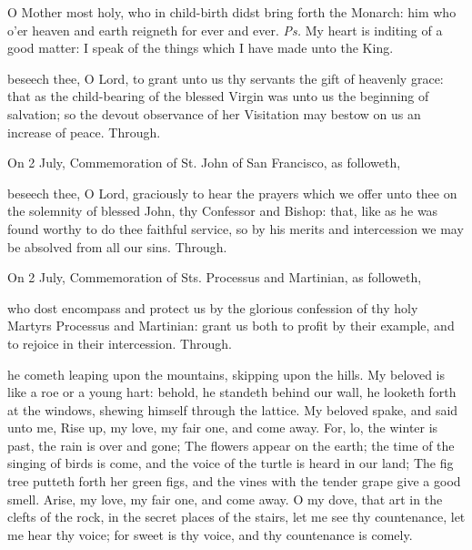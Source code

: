 \vspace{-0.2\baselineskip}

\introit
{} O Mother most holy, who in child-birth didst bring forth the Monarch: him who o'er heaven and earth reigneth for ever and ever. \textit{Ps.} My heart is inditing of a good matter: I speak of the things which I have made unto the King.

\vspace{-0.2\baselineskip}

\collect
{} beseech thee, O Lord, to grant unto us thy servants the gift of heavenly grace: that as the child-bearing of the blessed Virgin was unto us the beginning of salvation; so the devout observance of her Visitation may bestow on us an increase of peace. Through.

\begin{rubric}
	 On 2 July, Commemoration of St. John of San Francisco, as followeth,
\end{rubric}
 beseech thee, O Lord, graciously to hear the prayers which we offer unto thee on the solemnity of blessed John, thy Confessor and Bishop: that, like as he was found worthy to do thee faithful service, so by his merits and intercession we may be absolved from all our sins. Through.

\begin{rubric}
	 On 2 July, Commemoration of Sts. Processus and Martinian, as followeth,
\end{rubric}
 who dost encompass and protect us by the glorious confession of thy holy Martyrs Processus and Martinian: grant us both to profit by their example, and to rejoice in their intercession. Through.

 he cometh leaping upon the mountains, skipping upon the hills. My beloved is like a roe or a young hart: behold, he standeth behind our wall, he looketh forth at the windows, shewing himself through the lattice. My beloved spake, and said unto me, Rise up, my love, my fair one, and come away. For, lo, the winter is past, the rain is over and gone; The flowers appear on the earth; the time of the singing of birds is come, and the voice of the turtle is heard in our land; The fig tree putteth forth her green figs, and the vines with the tender grape give a good smell. Arise, my love, my fair one, and come away. O my dove, that art in the clefts of the rock, in the secret places of the stairs, let me see thy countenance, let me hear thy voice; for sweet is thy voice, and thy countenance is comely.

